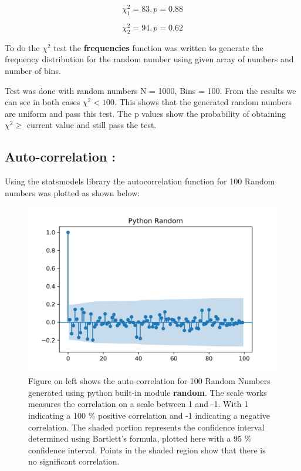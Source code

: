 \documentclass{article}
\begin{document}
\begin{equation}
    \chi^2_1 = 83, p=0.88 
\end{equation}

\begin{equation}
    \chi^2_2 = 94, p=0.62
\end{equation}


To do the $ \chi^2 $ test the \textbf{frequencies} function was written to generate the frequency 
distribution for the random number using given array of numbers and number of bins. 

Test was done with random numbers N = 1000, Bins = 100. From the results we can see in both cases 
$ \chi^2 < 100 $. This shows that the generated random numbers are uniform 
and pass this test. The p values show the probability of obtaining $ \chi^2 \geq $  
current value and still pass the test. 

\subsection{Auto-correlation :}
Using the statsmodels library the autocorrelation function for 100 Random numbers was plotted
as shown below:

    \begin{figure}
        \begin{minipage}[c]{0.5\textwidth}
        \includegraphics[width=\textwidth]{task1a1.png}
        \end{minipage}\hfill
        \begin{minipage}[c]{0.5\textwidth}
        \caption{
            Figure on left shows the auto-correlation for 100 Random Numbers generated using python
            built-in module \textbf{random}.
            The scale works measures the correlation on a scale 
            between 1 and -1. With 1 indicating a 100 \% positive correlation and -1 indicating a negative 
            correlation. The shaded portion represents the confidence interval determined using 
            Bartlett's formula, plotted here with a 95 \% confidence interval. Points in the shaded 
            region show that there is no significant correlation.
        } \label{fig:2a}
        \end{minipage}
    \end{figure}
\end{document}

